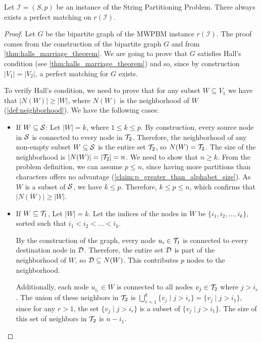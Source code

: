 \begin{lemma} \label{lemma:matching_existence}
    Let $\mathcal{I}=(S, p)$ be an instance of the String Partitioning Problem. There always exists a perfect matching on $r(\mathcal{I})$.
\end{lemma}

\begin{proof}
    Let $G$ be the bipartite graph of the MWPBM instance $r(\mathcal{I})$. The proof comes from the construction of the bipartite graph $G$ and from \cref{thm:halls_marriage_theorem}. We are going to prove that $G$ satisfies Hall's condition (see \cref{thm:halls_marriage_theorem}) and so, since by construction $|V_1| = |V_2|$, a perfect matching for $G$ exists.

    To verify Hall's condition, we need to prove that for any subset $W \subseteq V_1$ we have that $|N(W)| \geq |W|$, where $N(W)$ is the neighborhood of $W$ (\cref{def:neighborhood}). We have the following cases:
    \begin{itemize}[leftmargin=25pt]
        \item If $W \subseteq \mathcal{S}$: Let $|W| = k$, where $1 \le k \le p$. By construction, every source node in $\mathcal{S}$ is connected to every node in $\mathcal{T}_{2}$. Therefore, the neighborhood of any non-empty subset $W \subseteq \mathcal{S}$ is the entire set $\mathcal{T}_{2}$, so $N(W) = \mathcal{T}_{2}$. The size of the neighborhood is $|N(W)| = |\mathcal{T}_{2}| = n$. We need to show that $n \ge k$. From the problem definition, we can assume $p \le n$, since having more partitions than characters offers no advantage (\cref{claim:p_greater_than_alphabet_size}). As $W$ is a subset of $\mathcal{S}$, we have $k \le p$. Therefore, $k \le p \le n$, which confirms that $|N(W)| \ge |W|$. 
        
        \item If $W \subseteq \mathcal{T}_{1}$, Let $|W| = k$. Let the indices of the nodes in $W$ be $\{i_1, i_2, \dots, i_k\}$, sorted such that $i_1 < i_2 < \dots < i_k$.
        
        By the construction of the graph, every node $u_i \in \mathcal{T}_{1}$ is connected to every destination node in $\mathcal{D}$. Therefore, the entire set $\mathcal{D}$ is part of the neighborhood of $W$, so $\mathcal{D} \subseteq N(W)$. This contributes $p$ nodes to the neighborhood.

        Additionally, each node $u_{i_r} \in W$ is connected to all nodes $v_j \in \mathcal{T}_{2}$ where $j > i_r$. The union of these neighbors in $\mathcal{T}_{2}$ is $\bigcup_{r=1}^{k} \{v_j \mid j > i_r\} = \{v_j \mid j > i_1\}$, since for any $r > 1$, the set $\{v_j \mid j > i_r\}$ is a subset of $\{v_j \mid j > i_1\}$. The size of this set of neighbors in $\mathcal{T}_{2}$ is $n - i_1$.
        

\end{itemize}
\end{proof}
